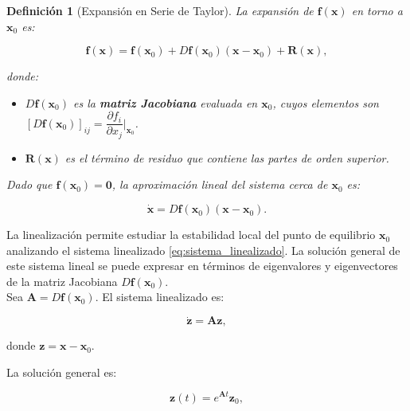 \documentclass[12pt, a4paper]{report}
\newtheorem{definition}{Definición}
\begin{document}
\begin{definition}[Expansión en Serie de Taylor]
	La expansión de \(\mathbf{f}(\mathbf{x})\) en torno a \(\mathbf{x}_0\) es:

\begin{equation}
    \mathbf{f}(\mathbf{x}) = \mathbf{f}(\mathbf{x}_0) + D\mathbf{f}(\mathbf{x}_0)(\mathbf{x} - \mathbf{x}_0) + \mathbf{R}(\mathbf{x}),
\end{equation}

donde:

\begin{itemize}
    \item \( D\mathbf{f}(\mathbf{x}_0) \) es la \textbf{matriz Jacobiana} evaluada en \(\mathbf{x}_0\), cuyos elementos son \( \left[ D\mathbf{f}(\mathbf{x}_0) \right]_{ij} = \dfrac{\partial f_i}{\partial x_j} \bigg|_{\mathbf{x}_0} \).
    \item \( \mathbf{R}(\mathbf{x}) \) es el término de residuo que contiene las partes de orden superior.
\end{itemize}

Dado que \(\mathbf{f}(\mathbf{x}_0) = \mathbf{0}\), la aproximación lineal del sistema cerca de \(\mathbf{x}_0\) es:

\begin{equation}\label{eq:sistema_linealizado}
    \dot{\mathbf{x}} = D\mathbf{f}(\mathbf{x}_0)(\mathbf{x} - \mathbf{x}_0).
\end{equation}
\end{definition}

La linealización permite estudiar la estabilidad local del punto de equilibrio \(\mathbf{x}_0\) analizando el sistema linealizado \eqref{eq:sistema_linealizado}. La solución general de este sistema lineal se puede expresar en términos de eigenvalores y eigenvectores de la matriz Jacobiana \( D\mathbf{f}(\mathbf{x}_0) \).\\

Sea \( \mathbf{A} = D\mathbf{f}(\mathbf{x}_0) \). El sistema linealizado es:

\begin{equation}
    \dot{\mathbf{z}} = \mathbf{A} \mathbf{z},
\end{equation}

donde \( \mathbf{z} = \mathbf{x} - \mathbf{x}_0 \).

La solución general es:

\begin{equation}
    \mathbf{z}(t) = e^{\mathbf{A} t} \mathbf{z}_0,
\end{equation}
\end{document}

